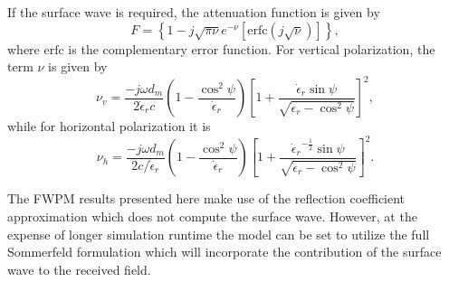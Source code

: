 \documentclass[10pt,journal,twoside]{IEEEtran}
\begin{document}
If the surface wave is required, the attenuation function is given by 
\begin{equation}
\label{eq:F}
F = \left\{ 1 - j\sqrt{\pi\nu}e^{-\nu} \left[ \text{erfc}\left(j\sqrt{\nu}\right) \right] \right\},
\end{equation}
where $\text{erfc}$ is the complementary error function. For vertical polarization, the term $\nu$ is given by
\begin{equation}
\label{eq:atten_arg_v}
\nu_v = \dfrac{ -j\omega d_m  }{2\dot\epsilon_rc} \left(1 - \dfrac{\cos^2\psi}{\dot\epsilon_r}\right)
\left[ 1 + \dfrac{\dot\epsilon_r\sin\psi} {\sqrt{ \dot\epsilon_r - \cos^2\psi } } \right]^2,
\end{equation}
while for horizontal polarization it is
\begin{equation}
\label{eq:atten_arg_h}
\nu_h = \dfrac{ -j\omega d_m  }{2c/\dot\epsilon_r} \left(1 - \dfrac{\cos^2\psi}{\dot\epsilon_r}\right)
\left[ 1 + \dfrac{ {\dot\epsilon_r}^{-\frac{1}{2}}\sin\psi } { \sqrt{ \dot\epsilon_r - \cos^2\psi } } \right]^2.
\end{equation}

The FWPM results presented here make use of the reflection coefficient approximation which does not compute the surface wave. However, at the expense of longer simulation runtime the model can be set to utilize the full Sommerfeld formulation which will incorporate the contribution of the surface wave to the received field. %
%
\end{document}
